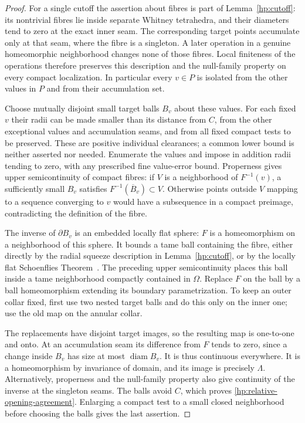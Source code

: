 \documentclass[11pt]{article}
\numberwithin{equation}{section}
\theoremstyle{definition}
\theoremstyle{remark}
\begin{document}
\begin{proof}
For a single cutoff the assertion about fibres is part of
Lemma~\ref{hp:cutoff}: its nontrivial fibres lie inside separate
Whitney tetrahedra, and their diameters tend to zero at the exact
inner seam.  The corresponding target points accumulate only at that
seam, where the fibre is a singleton.  A later operation in a genuine
homeomorphic neighborhood changes none of those fibres.  Local
finiteness of the operations therefore preserves this description and
the null-family property on every compact localization.  In
particular every $v\in P$ is isolated from the other values in $P$
and from their accumulation set.

Choose mutually disjoint small target balls $B_v$ about these values.
For each fixed $v$ their radii can be made smaller than its distance
from $C$, from the other exceptional values and accumulation seams,
and from all fixed compact tests to be preserved.  These are positive
individual clearances; a common lower bound is neither asserted nor
needed.  Enumerate the values and impose in addition radii tending to
zero, with any prescribed fine value-error bound.  Properness gives
upper semicontinuity of compact fibres: if $V$ is a neighborhood of
$F^{-1}(v)$, a sufficiently small $B_v$ satisfies
$F^{-1}(\overline B_v)\subset V$.  Otherwise points outside $V$
mapping to a sequence converging to $v$ would have a subsequence in a
compact preimage, contradicting the definition of the fibre.

The inverse of $\partial B_v$ is an embedded locally flat sphere:
$F$ is a homeomorphism on a neighborhood of this sphere.  It bounds a
tame ball containing the fibre, either directly by the radial squeeze
description in Lemma~\ref{hp:cutoff}, or by the locally flat
Schoenflies Theorem~\cite[Theorem~5]{Brown1960}.  The preceding
upper semicontinuity places this ball inside a tame neighborhood
compactly contained in $\Omega$.  Replace $F$ on the ball by a ball
homeomorphism extending its boundary parametrization.  To keep an
outer collar fixed, first use two nested target balls and do this
only on the inner one; use the old map on the annular collar.

The replacements have disjoint target images, so the resulting map
is one-to-one and onto.  At an accumulation seam its difference from
$F$ tends to zero, since a change inside $B_v$ has size at most
$\operatorname{diam} B_v$.  It is thus continuous everywhere.  It is a
homeomorphism by invariance of domain, and its image is precisely
$\Lambda$.  Alternatively, properness and the null-family property
also give continuity of the inverse at the singleton seams.  The
balls avoid $C$, which proves
\eqref{hp:relative-opening-agreement}.  Enlarging a compact test to
a small closed neighborhood before choosing the balls gives the last
assertion.
\end{proof}
\end{document}

